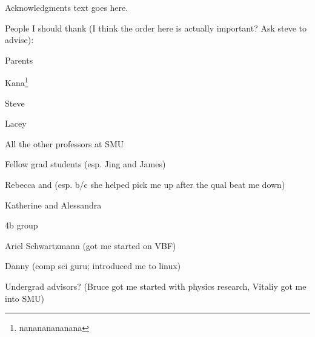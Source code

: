 Acknowledgments text goes here.

People I should thank (I think the order here is actually important? Ask steve to advise):

Parents

Kana\footnote{nanananananana}

Steve

Lacey

All the other professors at SMU

Fellow grad students (esp. Jing and James)

Rebecca and (esp. b/c she helped pick me up after the qual beat me down)

Katherine and Alessandra

4b group

Ariel Schwartzmann (got me started on VBF)

Danny (comp sci guru; introduced me to linux)

Undergrad advisors? (Bruce got me started with physics research, Vitaliy got me into SMU)

